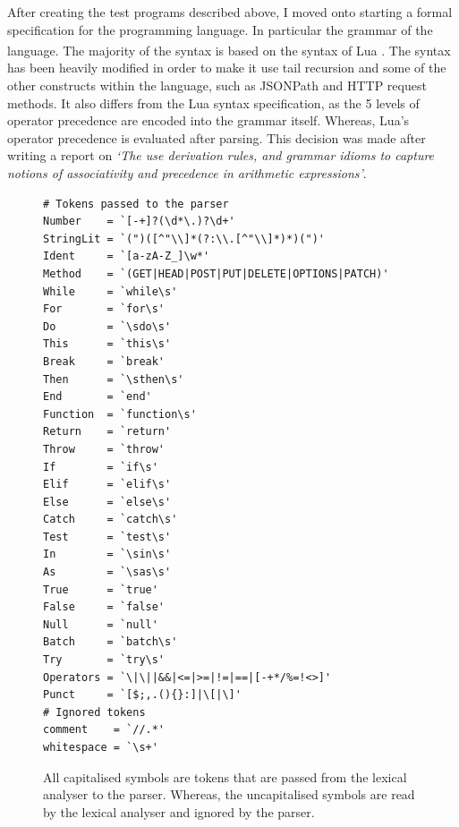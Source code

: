 \documentclass[]{full}
\theoremstyle{definition}
\begin{document}
After creating the test programs described above, I moved onto starting a formal specification for the programming language. In particular the grammar of the language. The majority of the syntax is based on the syntax of Lua \textsuperscript{\cite{lua_syntax_specification}}. The syntax has been heavily modified in order to make it use tail recursion and some of the other constructs within the language, such as JSONPath and HTTP request methods. It also differs from the Lua syntax specification, as the 5 levels of operator precedence are encoded into the grammar itself. Whereas, Lua's operator precedence is evaluated after parsing. This decision was made after writing a report on \textit{`The use derivation rules, and grammar idioms to capture notions of associativity and precedence in arithmetic expressions'}.

\begin{figure}[H]
    \begin{verbatim}
# Tokens passed to the parser
Number    = `[-+]?(\d*\.)?\d+'
StringLit = `(")([^"\\]*(?:\\.[^"\\]*)*)(")'
Ident     = `[a-zA-Z_]\w*'
Method    = `(GET|HEAD|POST|PUT|DELETE|OPTIONS|PATCH)'
While     = `while\s'
For       = `for\s'
Do        = `\sdo\s'
This      = `this\s'
Break     = `break'
Then      = `\sthen\s'
End       = `end'
Function  = `function\s'
Return    = `return'
Throw     = `throw'
If        = `if\s'
Elif      = `elif\s'
Else      = `else\s'
Catch     = `catch\s'
Test      = `test\s'
In        = `\sin\s'
As        = `\sas\s'
True      = `true'
False     = `false'
Null      = `null'
Batch     = `batch\s'
Try       = `try\s'
Operators = `\|\||&&|<=|>=|!=|==|[-+*/%=!<>]'
Punct     = `[$;,.(){}:]|\[|\]'
# Ignored tokens
comment    = `//.*'
whitespace = `\s+'
    \end{verbatim}
    
    All capitalised symbols are tokens that are passed from the lexical analyser to the parser. Whereas, the uncapitalised symbols are read by the lexical analyser and ignored by the parser.
\end{figure}
\end{document}
